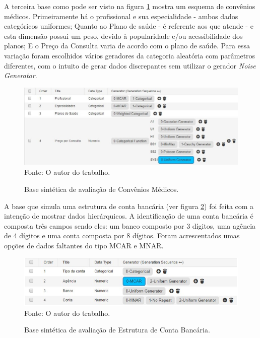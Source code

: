 \documentclass[
	12pt,				%
	openright,			%
	oneside,			%
	a4paper,			%
	english,			%
	brazil				%
	]{abntex2}
\begin{document}
		
		A terceira base como pode ser visto na figura \ref{fig:CMModelo} mostra um esquema de convênios médicos.
		Primeiramente há o profissional e sua especialidade - ambos dados categóricos uniformes;
		Quanto ao Plano de saúde - é referente aos que atende - e esta dimensão possui um peso, devido à popularidade e/ou acessibilidade dos planos;
		E o Preço da Consulta varia de acordo com o plano de saúde.
		Para essa variação foram escolhidos vários geradores da categoria aleatória com parâmetros diferentes, com o intuito de gerar dados discrepantes sem utilizar o gerador \emph{Noise Generator}.
		\par
		\begin{figure}[h!]
			\centering
			\caption{Base sintética de avaliação de Convênios Médicos.}
			\includegraphics[width=\linewidth]{./figures/Resultados/CMModelo.jpg}
			\label{fig:CMModelo}
			\footnotesize Fonte: O autor do trabalho.
		\end{figure}

		A base que simula uma estrutura de conta bancária (ver figura \ref{fig:BancoModelo}) foi feita com a intenção de mostrar dados hierárquicos.
		A identificação de uma conta bancária é composta três campos sendo eles: 
		 um banco composto por 3 dígitos,
		 uma agência de 4 dígitos e 
		 uma conta composta por 8 dígitos.
		Foram acrescentados umas opções de dados faltantes do tipo MCAR e MNAR.

		\begin{figure}[h!]
			\centering
			\caption{Base sintética de avaliação de Estrutura de Conta Bancária.}
			\includegraphics[width=\linewidth]{./figures/Resultados/BancoModelo.png}
			\label{fig:BancoModelo}
			\footnotesize Fonte: O autor do trabalho.
		\end{figure}
\end{document}
